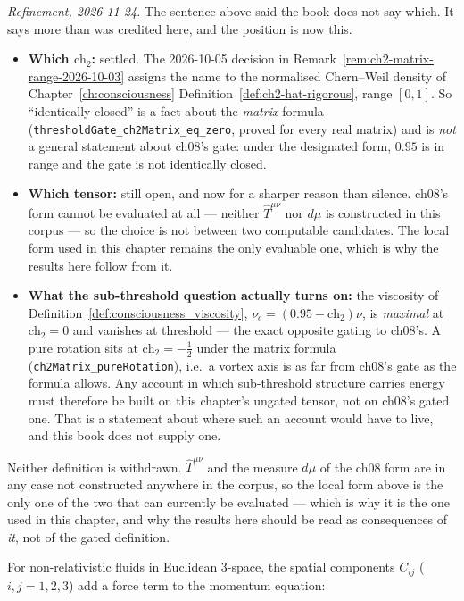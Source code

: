 \begin{remark}
\emph{Refinement, 2026-11-24.} The sentence above said the book does not say
which. It says more than was credited here, and the position is now this.
\begin{itemize}
\item \textbf{Which $\text{ch}_2$:} settled. The 2026-10-05 decision in
Remark~\ref{rem:ch2-matrix-range-2026-10-03} assigns the name to the normalised
Chern--Weil density of Chapter~\ref{ch:consciousness}
Definition~\ref{def:ch2-hat-rigorous}, range $[0,1]$. So ``identically
closed'' is a fact about the \emph{matrix} formula
(\texttt{thresholdGate\_ch2Matrix\_eq\_zero}, proved for every real matrix) and
is \emph{not} a general statement about ch08's gate: under the designated form,
$0.95$ is in range and the gate is not identically closed.
\item \textbf{Which tensor:} still open, and now for a sharper reason than
silence. ch08's form cannot be evaluated at all --- neither $\hat{T}^{\mu\nu}$
nor $d\mu$ is constructed in this corpus --- so the choice is not between two
computable candidates. The local form used in this chapter remains the only
evaluable one, which is why the results here follow from it.
\item \textbf{What the sub-threshold question actually turns on:} the viscosity
of Definition~\ref{def:consciousness_viscosity}, $\nu_c = (0.95 - \text{ch}_2)\nu$,
is \emph{maximal} at $\text{ch}_2 = 0$ and vanishes at threshold --- the exact
opposite gating to ch08's. A pure rotation sits at $\text{ch}_2 = -\tfrac12$
under the matrix formula (\texttt{ch2Matrix\_pureRotation}), i.e.\ a vortex axis
is as far from ch08's gate as the formula allows. Any account in which
sub-threshold structure carries energy must therefore be built on this
chapter's ungated tensor, not on ch08's gated one. That is a statement about
where such an account would have to live, and this book does not supply one.
\end{itemize}

Neither definition is withdrawn. $\hat{T}^{\mu\nu}$ and the measure $d\mu$ of the
ch08 form are in any case not constructed anywhere in the corpus, so the local
form above is the only one of the two that can currently be evaluated --- which is
why it is the one used in this chapter, and why the results here should be read
as consequences of \emph{it}, not of the gated definition.
\end{remark}

For non-relativistic fluids in Euclidean 3-space, the spatial components $C_{ij}$ ($i, j = 1, 2, 3$) add a force term to the momentum equation:

